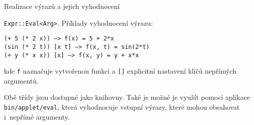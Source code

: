 \documentclass[thesis=M,czech]{FITthesis}[2012/06/26]
\newcommand{\id}[1]{\texttt{#1}}
\newcommand{\binDir}{\id{bin}}
\newcommand{\appletDir}{\id{\binDir{}/\-applet}}
\newcommand{\appletFn}[1]{\id{\appletDir{}/\-#1}}
\begin{document}
\begin{section}{Realizace výrazů a jejich vyhodnocení}
\begin{paragraph}{\id{Expr::\-Eval<Arg>}.}
Příklady vyhodnocení výrazu:
\begin{center}
   \id{(+ 5 (* 2 x))  -->  f(x) = 5 + 2*x} \\
   \id{(sin (* 2 t)) [x t]  -->  f(x, t) = sin(2*t)} \\
   \id{(+ y (* x x)) [x]  -->  f(x, y) = y + x*x}
\end{center}
kde \id{f} naznačuje vytvořenou funkci
a \id{[]} explicitní nastavení klíčů nepřímých argumentů.
\end{paragraph} %


\bigskip

Obě třídy jsou dostupné jako knihovny.
Také je možné je využít pomocí aplikace \appletFn{eval},
která vyhodnocuje vstupní výrazy,
které mohou obsahovat i~nepřímé argumenty.
\end{section} %

\end{document}
